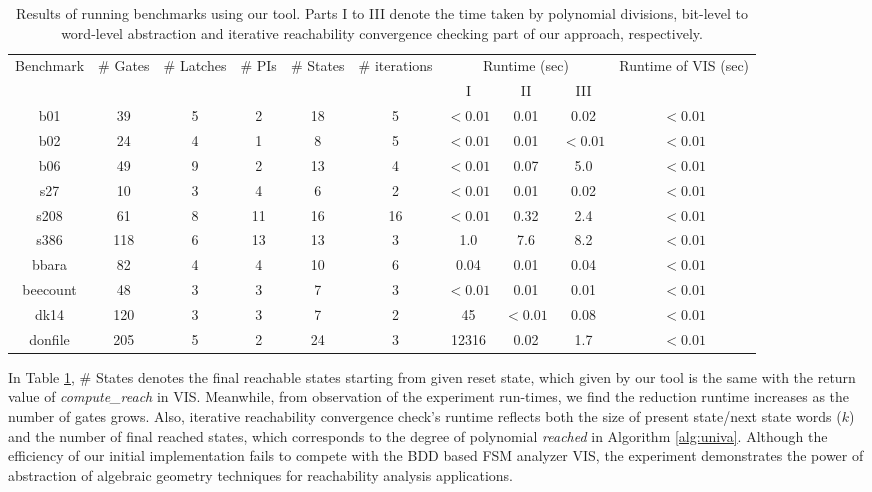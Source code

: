 \begin{table}[H]
\centering
\caption{Results of running benchmarks using our tool. 
\small{Parts I to III denote the time taken by polynomial divisions,
  bit-level to word-level abstraction and iterative reachability
  convergence checking part of our approach, respectively.}}
{\small 
\begin{tabular}{|c||c|c|c|c|c|c|c|c|c|}
\hline
\multirow{3}{*}{\centering Benchmark} 
& \multirow{3}{0.9cm}{\centering \# Gates} 
& \multirow{3}{1.1cm}{\centering \# Latches} 
& \multirow{3}{*}{\centering \# PIs}
 & \multirow{3}{0.9cm}{\centering \# States}
 & \multirow{3}{1.3cm}{\centering \# iterations}
 & \multicolumn{3}{c|}{\multirow{2}{2.0cm}{\centering Runtime (sec)}}
 & \multirow{3}{1.8cm}{\centering Runtime of VIS (sec)} \\
  & & & & & &\multicolumn{3}{c|}{}& \\
  \cline{7-9}
    & & & & & & I & II & III & \\
\hline
\hline
b01 & 39  & 5  & 2 & 18  & 5  & $<0.01$ & 0.01 & 0.02 & $<0.01$\\
b02 & 24  & 4  & 1 & 8 & 5 & $<0.01$  & 0.01 & $<0.01$ & $<0.01$ \\
b06 & 49  & 9  & 2 & 13 & 4 & $<0.01$ & 0.07 & 5.0 & $<0.01$ \\
s27 & 10 & 3 & 4 & 6 & 2 & $<0.01$ & 0.01 & 0.02  & $<0.01$  \\
s208 & 61 & 8 & 11 & 16 & 16 & $<0.01$ & 0.32 & 2.4 & $<0.01$ \\
s386 & 118 & 6 & 13 & 13  & 3 & 1.0 & 7.6 & 8.2  & $<0.01$ \\
bbara & 82 & 4 & 4 & 10 & 6 & 0.04 & 0.01 & 0.04  & $<0.01$ \\
beecount & 48  & 3  & 3 & 7  & 3  &$<0.01$ & 0.01 & 0.01 & $<0.01$ \\
dk14 & 120  & 3  & 3 & 7  & 2  & 45 & $<0.01$ & 0.08 & $<0.01$\\
donfile & 205  & 5  & 2 & 24 & 3  & 12316 & 0.02 & 1.7  & $<0.01$\\
\hline
\end{tabular}
}
\label{tab:recha_result}  
\end{table} 

In Table \ref{tab:recha_result}, \# States denotes the final reachable states
starting from given reset state, which given by our tool is the same with
the return value of {\it compute\_reach} in VIS. Meanwhile, from observation
of the experiment run-times, we find the reduction runtime increases
as the number of gates grows. Also, iterative reachability convergence
check's runtime reflects both the size of present state/next state
words ($k$) and the number of final reached states, which corresponds
to the degree of polynomial {\it reached} in Algorithm \ref{alg:univa}. 
Although the efficiency of our initial implementation fails to compete
with the BDD based FSM analyzer VIS, the experiment
demonstrates the power of abstraction of algebraic geometry techniques
for reachability analysis applications. 

